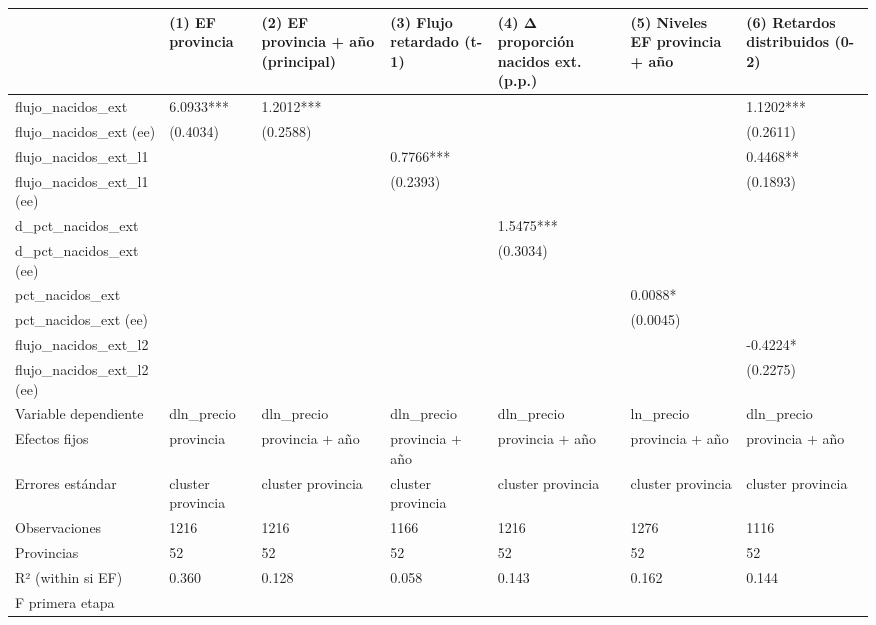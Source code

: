 \begin{tabular}{lllllll}
\toprule
 & (1) EF provincia & (2) EF provincia + año (principal) & (3) Flujo retardado (t-1) & (4) Δ proporción nacidos ext. (p.p.) & (5) Niveles EF provincia + año & (6) Retardos distribuidos (0-2) \\
\midrule
flujo\_nacidos\_ext & 6.0933*** & 1.2012*** &  &  &  & 1.1202*** \\
flujo\_nacidos\_ext (ee) & (0.4034) & (0.2588) &  &  &  & (0.2611) \\
flujo\_nacidos\_ext\_l1 &  &  & 0.7766*** &  &  & 0.4468** \\
flujo\_nacidos\_ext\_l1 (ee) &  &  & (0.2393) &  &  & (0.1893) \\
d\_pct\_nacidos\_ext &  &  &  & 1.5475*** &  &  \\
d\_pct\_nacidos\_ext (ee) &  &  &  & (0.3034) &  &  \\
pct\_nacidos\_ext &  &  &  &  & 0.0088* &  \\
pct\_nacidos\_ext (ee) &  &  &  &  & (0.0045) &  \\
flujo\_nacidos\_ext\_l2 &  &  &  &  &  & -0.4224* \\
flujo\_nacidos\_ext\_l2 (ee) &  &  &  &  &  & (0.2275) \\
Variable dependiente & dln\_precio & dln\_precio & dln\_precio & dln\_precio & ln\_precio & dln\_precio \\
Efectos fijos & provincia & provincia + año & provincia + año & provincia + año & provincia + año & provincia + año \\
Errores estándar & cluster provincia & cluster provincia & cluster provincia & cluster provincia & cluster provincia & cluster provincia \\
Observaciones & 1216 & 1216 & 1166 & 1216 & 1276 & 1116 \\
Provincias & 52 & 52 & 52 & 52 & 52 & 52 \\
R² (within si EF) & 0.360 & 0.128 & 0.058 & 0.143 & 0.162 & 0.144 \\
F primera etapa &  &  &  &  &  &  \\
\bottomrule
\end{tabular}
